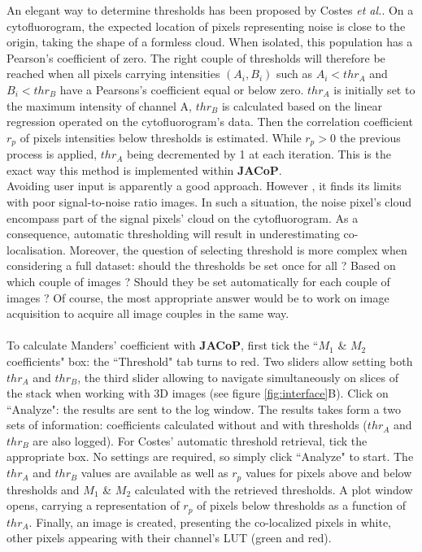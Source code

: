 \documentclass[]{spie}  %
\begin{document}
An elegant way to determine thresholds has been proposed by Costes \textit{et al.}\cite{Costes2004}. On a cytofluorogram, the expected location of pixels representing noise is close to the origin, taking the shape of a formless cloud. When isolated, this population has a Pearson's coefficient of zero. The right couple of thresholds will therefore be reached when all pixels carrying intensities $(A_i, B_i)$ such as $A_i<thr_A$ and $B_i<thr_B$ have a Pearsons's coefficient equal or below zero. $thr_A$ is initially set to the maximum intensity of channel A, $thr_B$ is calculated based on the linear regression operated on the cytofluorogram's data. Then the correlation coefficient $r_p$ of pixels intensities below thresholds is estimated. While $r_p>0$ the previous process is applied, $thr_A$ being decremented by 1 at each iteration. This is the exact way this method is implemented within \textbf{JACoP}.\\
Avoiding user input is apparently a good approach. However , it finds its limits with poor signal-to-noise ratio images. In such a situation, the noise pixel's cloud encompass part of the signal pixels' cloud on the cytofluorogram. As a consequence, automatic thresholding will result in underestimating co-localisation. Moreover, the question of selecting threshold is more complex when considering a full dataset: should the thresholds be set once for all ? Based on which couple of images ? Should they be set automatically for each couple of images ? Of course, the most appropriate answer would be to work on image acquisition to acquire all image couples in the same way.\\\\
To calculate Manders' coefficient with \textbf{JACoP}, first tick the ``$M_1$ \& $M_2$ coefficients" box: the ``Threshold" tab turns to red. Two sliders allow setting both $thr_A$ and $thr_B$, the third slider allowing to navigate simultaneously on slices of the stack when working with 3D images (see figure \ref{fig:interface}B). Click on ``Analyze": the results are sent to the log window. The results takes form a two sets of information: coefficients calculated without and with thresholds ($thr_A$ and $thr_B$ are also logged). For Costes' automatic threshold retrieval, tick the appropriate box. No settings are required, so simply click ``Analyze" to start. The $thr_A$ and $thr_B$ values are available as well as $r_p$ values for pixels above and below thresholds and $M_1$ \& $M_2$ calculated with the retrieved thresholds. A plot window opens, carrying a representation of $r_p$ of pixels below thresholds as a function of $thr_A$. Finally, an image is created, presenting the co-localized pixels in white, other pixels appearing with their channel's LUT (green and red).
\end{document}
